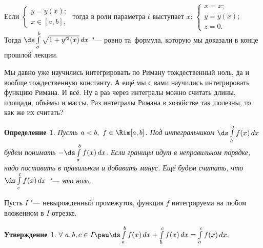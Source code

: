 \documentclass[a4paper,10pt,twoside]{article}
\newtheorem{Def}{Определение}[section]
\newtheorem{Ut}{Утверждение}[section]
\begin{document}
    Если $\begin{cases} y=y(x);\\ x\in[a,b],\end{cases}$ тогда в роли параметра $t$ выступает $x$:
    $\begin{cases}
    	x=x;\\ y=y(x);\\ z=0.
    \end{cases}$ Тогда $\ds\int\limits_a^b\sqrt{1+y'^2(x)}\,dx$ "--- ровно та~формула, которую мы доказали
    в конце прошлой лекции.
    
    Мы давно уже научились интегрировать по Риману тождественный ноль, да и вообще тождественную константу.
    А ещё мы с вами научились интегрировать функцию Римана. И всё. Ну а раз через интегралы можно считать длины, площади, объёмы и массы. Раз интегралы Римана в хозяйстве так~полезны, то
    как же их считать?
    
    \begin{Def}
    	Пусть $a<b,\ f\in\Rim[a,b]$. Под интегральчиком $\ds\int\limits_b^af(x)\,dx$ будем понимать
    	$-\ds\int\limits_a^bf(x)\,dx$.
    	Если границы идут в неправильном порядке, надо поставить в правильном и добавить минус.
    	Ещё будем считать, что $\ds\int\limits_c^cf(x)\,dx$ "--- это ноль.
    \end{Def} 
    
    Пусть $I$ "--- невырожденный промежуток, функция $f$ интегрируема на любом вложенном в $I$ отрезке.
    
    \begin{Ut}
    	$\forall\  a,b,c\in I\pau \ds\int\limits_a^bf(x)\,dx+\int\limits_b^cf(x)\,dx=\int\limits_a^cf(x)\,dx.$
    \end{Ut}
    
\end{document}
